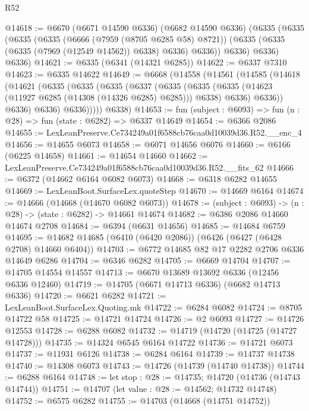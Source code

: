 \begin{lexlean}{R52}
\begin{coremodule}
@14618 := @6670
    (@6671 @14590 @6336)
    (@6682 @14590 @6336)
    (@6335
      (@6335
        (@6335
          (@6335
            (@6666 (@7959 (@8705 @6285 @58) @8721))
            (@6335 (@6335 (@6335 (@7969 (@12549 @14562)) @6338) @6336) @6336))
          @6336)
        @6336)
      @6336)
@14621 := @6335 (@6341 (@14321 @6285))
@14622 := @6337 @7310
@14623 := @6335 @14622
@14649 := @6668
    (@14558
      (@14561
        (@14585
          (@14618
            (@14621
              (@6335
                (@6335
                  (@6335
                    (@6337
                      (@6335
                        (@6335
                          (@6335 (@14623 (@11927 @6285 (@14308 (@14326 @6285) @6285))) @6338)
                          @6336)
                        @6336))
                    @6336)
                  @6336)
                @6336)))))
      @6338)
@14653 := fun (subject : @6093) => fun (n : @28) => fun (state : @6282) => @6337 @14649
@14654 := @6366 @2086
@14655 := LexLeanPreserve.Ce734249a01f6588cb76caa0d10039d36.R52.__enc_4
@14656 := @14655 @6073
@14658 := @6071 @14656 @6076
@14660 := @6166 (@6225 @14658)
@14661 := @14654 @14660
@14662 := LexLeanPreserve.Ce734249a01f6588cb76caa0d10039d36.R52.__fits_62
@14666 := @6372 (@14662 @6164 @6082 @6073)
@14668 := @6318 @6282 @14655
@14669 := LexLeanBoot.SurfaceLex.quoteStep
@14670 := @14669 @6164
@14674 := @14666 (@14668 (@14670 @6082 @6073))
@14678 := (subject : @6093) -> (n : @28) -> (state : @6282) -> @14661 @14674
@14682 := @6386 @2086 @14660 @14674 @2708
@14684 := @6394 (@6631 @14656)
@14685 := @14684 @6759
@14695 := @14682 @14685 (@6410 (@6420 @2086)) (@6426 (@6427 (@6428 @2708) @14660 @6404))
@14703 := @6772 @14685 @82 @17 @2282 @2706 @6336 @14649 @6286
@14704 := @6346 @6282
@14705 := @6669 @14704
@14707 := @14705 @14554 @14557
@14713 := @6670 @13689 @13692 @6336 (@12456 @6336 @12460)
@14719 := @14705 (@6671 @14713 @6336) (@6682 @14713 @6336)
@14720 := @6621 @6282
@14721 := LexLeanBoot.SurfaceLex.Quoting.mk
@14722 := @6284 @6082
@14724 := @8705 @14722 @58
@14725 := @14721 @14724
@14726 := @2 @6093
@14727 := @14726 @12553
@14728 := @6288 @6082
@14732 := @14719 (@14720 (@14725 (@14727 @14728)))
@14735 := @14324 @6545 @6164 @14722
@14736 := @14721 @6073
@14737 := @11931 @6126
@14738 := @6284 @6164
@14739 := @14737 @14738
@14740 := @14308 @6073
@14743 := @14726 (@14739 (@14740 @14738))
@14744 := @6288 @6164
@14748 := let stop : @28 := @14735; @14720 (@14736 (@14743 @14744))
@14751 := @14707 (let value : @28 := @14562; @14732 @14748)
@14752 := @6575 @6282
@14755 := @14703 (@14668 (@14751 @14752))

\end{coremodule}
\end{lexlean}

